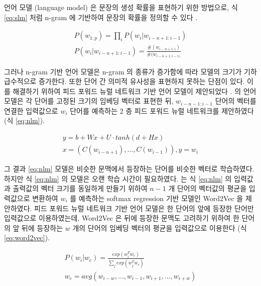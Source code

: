 \documentclass[oneside, ko,phd]{snuthesis_utf8_kor}
\begin{document}
언어 모델 (language model) 은 문장의 생성 확률을 표현하기 위한 방법으로, 식 \ref{eq:slm} 처럼 n-gram 에 기반하여 문장의 확률을 정의할 수 있다 \cite{jurafsky2014speech}.

\begin{equation}
  \label{eq:slm}
  \begin{aligned}
  P(w_{1:p}) = \prod_i P(w_i \vert w_{i-n+1:i-1}) \\
  P(w_i \vert w_{i-n+1:i-1}) = \frac{\#(w_{i-n+1:i})}{\#(w_{i-n+1:i-1)}}
  \end{aligned}
\end{equation}

그러나 n-gram 기반 언어 모델은 n-gram 의 종류가 증가함에 따라 모델의 크기가 기하급수적으로 증가한다.
또한 단어 간 의미적 유사성을 표현하지 못하는 단점이 있다.
이를 해결하기 위하여 피드 포워드 뉴럴 네트워크 기반 언어 모델이 제안되었다 \cite{bengio2003neural}.
\cite{bengio2003neural} 의 언어 모델은 각 단어를 고정된 크기의 임베딩 벡터로 표현한 뒤, $w_{i-n-1:i-1}$ 단어의 벡터를 연결한 입력값으로 $w_i$ 단어를 예측하는 2 층 피드 포워드 뉴럴 네트워크를 제안하였다 (식 \ref{eq:nlm}).

\begin{equation}
  \label{eq:nlm}
  \begin{aligned}
  y = b + Wx + U \cdot tanh(d + Hx) \\
  x = (C(w_{i-n+1}), \dots, C(w_{i-1})), y = w_i
  \end{aligned}
\end{equation}

그 결과 \ref{eq:nlm} 모델은 비슷한 문맥에서 등장하는 단어를 비슷한 벡터로 학습하였다.
하지만 식 \ref{eq:nlm} 의 모델은 오랜 학습 시간이 필요하였다.
\cite{mikolov2013efficient} 는 식 \ref{eq:nlm} 의 입력값과 출력값의 벡터 크기를 동일하게 만들기 위하여 $n-1$ 개 단어의 벡터값의 평균을 입력값으로 변환하여 $w_i$ 를 예측하는 softmax regression 기반 모델인 Word2Vec 을 제안하였다.
피드 포워드 뉴럴 네트워크 기반 언어 모델은 한 단어의 앞에 등장한 단어만 입력값으로 이용하였는데, Word2Vec 은 뒤에 등장한 문맥도 고려하기 위하여 한 단어의 앞 뒤에 등장하는 $w$ 개의 단어의 임베딩 벡터의 평균을 입력값으로 이용한다 (식 \ref{eq:word2vec}).

\begin{equation}
  \label{eq:word2vec}
  \begin{aligned}
  P(w_i \vert w_c) = \frac{exp(w_i^T w_c)}{\sum_j exp(w_j^T w_c)} \\
  w_c = avg(w_{i-w}, \dots, w_{i-1}, w_{i+1}, \dots, w_{i+w})
  \end{aligned}
\end{equation}
\end{document}
